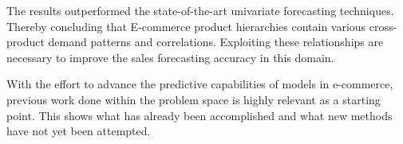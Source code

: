The results outperformed the state-of-the-art univariate forecasting techniques.
Thereby concluding that E-commerce product hierarchies contain various cross-product demand
patterns and correlations.
Exploiting these relationships are necessary to improve the sales forecasting
accuracy in this domain.

With the effort to advance the predictive capabilities of models in e-commerce,
previous work done within the problem space is highly relevant as a starting point.
This shows what has already been accomplished and what new methods have not yet been attempted.
